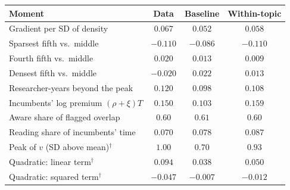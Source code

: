 \begin{tabular}{@{}lccc@{}}
\toprule
Moment & Data & Baseline & Within-topic \\
\midrule
Gradient per SD of density & $0.067$ & $0.052$ & $0.058$ \\
Sparsest fifth vs.\ middle & $-0.110$ & $-0.086$ & $-0.110$ \\
Fourth fifth vs.\ middle & $0.020$ & $0.013$ & $0.009$ \\
Densest fifth vs.\ middle & $-0.020$ & $0.022$ & $0.013$ \\
Researcher-years beyond the peak & $0.120$ & $0.098$ & $0.108$ \\
Incumbents' log premium $(\rho+\xi)T$ & $0.150$ & $0.103$ & $0.159$ \\
Aware share of flagged overlap & $0.60$ & $0.61$ & $0.60$ \\
Reading share of incumbents' time & $0.070$ & $0.078$ & $0.087$ \\
Peak of $v$ (SD above mean)$^\dagger$ & $1.00$ & $0.70$ & $0.93$ \\
Quadratic: linear term$^\dagger$ & $0.094$ & $0.038$ & $0.050$ \\
Quadratic: squared term$^\dagger$ & $-0.047$ & $-0.007$ & $-0.012$ \\
\bottomrule
\end{tabular}
